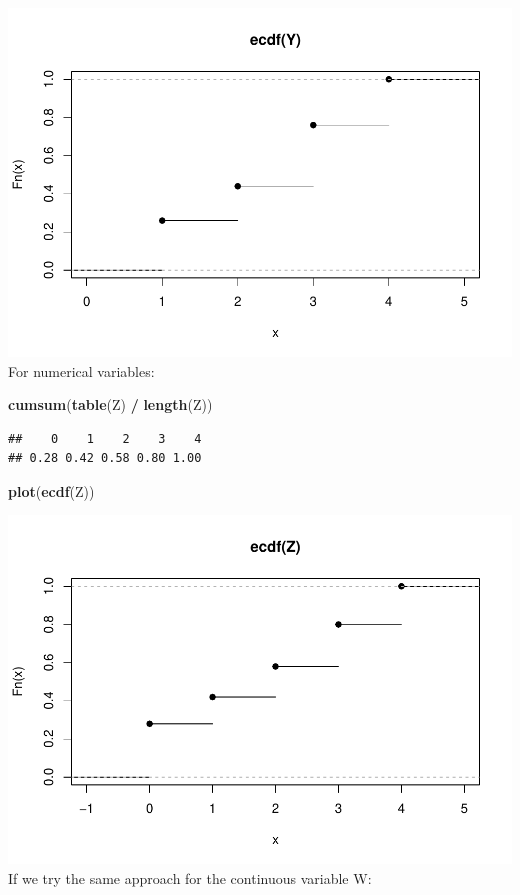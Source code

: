 \documentclass[
]{article}
\newenvironment{Shaded}{\begin{snugshade}}{\end{snugshade}}
\newcommand{\FunctionTok}[1]{\textcolor[rgb]{0.13,0.29,0.53}{\textbf{#1}}}
\newcommand{\NormalTok}[1]{#1}
\newcommand{\SpecialCharTok}[1]{\textcolor[rgb]{0.81,0.36,0.00}{\textbf{#1}}}
\begin{document}
\includegraphics{EDA_files/figure-latex/unnamed-chunk-8-1.pdf} For
numerical variables:

\begin{Shaded}
\begin{Highlighting}[]
\FunctionTok{cumsum}\NormalTok{(}\FunctionTok{table}\NormalTok{(Z) }\SpecialCharTok{/} \FunctionTok{length}\NormalTok{(Z))}
\end{Highlighting}
\end{Shaded}

\begin{verbatim}
##    0    1    2    3    4 
## 0.28 0.42 0.58 0.80 1.00
\end{verbatim}

\begin{Shaded}
\begin{Highlighting}[]
\FunctionTok{plot}\NormalTok{(}\FunctionTok{ecdf}\NormalTok{(Z))}
\end{Highlighting}
\end{Shaded}

\includegraphics{EDA_files/figure-latex/unnamed-chunk-9-1.pdf} If we try
the same approach for the continuous variable W:
\end{document}
